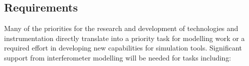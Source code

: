 \subsection{Requirements}
\label{sec:Sim:Req}
Many of the priorities for the research and development of technologies and instrumentation directly translate into a priority task for modelling work or a required effort in developing new capabilities for simulation tools. 
Significant support from interferometer modelling will be needed for tasks including:
